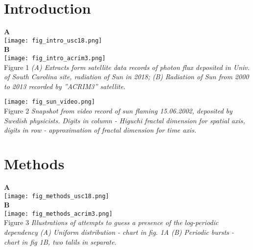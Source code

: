 \documentclass[a4paper]{article}
\begin{document}
\begin{center}
{\Large{}}
\vskip 12pt
\end{center}

\section*{Introduction}

{\large{\textbf{A}}}\\
\texttt{[image: fig\_intro\_usc18.png]}\\
\vskip 12pt
{\large{\textbf{B}}}\\
\texttt{[image: fig\_intro\_acrim3.png]}\\
\vskip 12pt
Figure 1 \textit{(A) Extracts form satellite data records of photon flux deposited in Univ. of South Carolina site, radiation of Sun in 2018; (B) Radiation of Sun from 2000 to 2013 recorded by ''ACRIM3'' satellite.}

\newpage
\texttt{[image: fig\_sun\_video.png]}\\
\vskip 12pt
Figure 2 \textit{Snapshot from video record of sun flaming 15.06.2002, deposited by Swedish physicists. Digits in column - Higuchi fractal dimension for spatial axis, digits in row - approximation of fractal dimension for time axis. }

\newpage
\section*{Methods}

{\large{\textbf{A}}}\\
\texttt{[image: fig\_methods\_usc18.png]}\\
\vskip 12pt
{\large{\textbf{B}}}\\
\texttt{[image: fig\_methods\_acrim3.png]}\\
\vskip 12pt
Figure 3 \textit{Illustrations of attempts to guess a presence of the log-periodic dependency (A) Uniform distribution - chart in fig. 1A (B) Periodic bursts - chart in fig 1B, two talils in separate.}
\vskip 12pt
\end{document}
